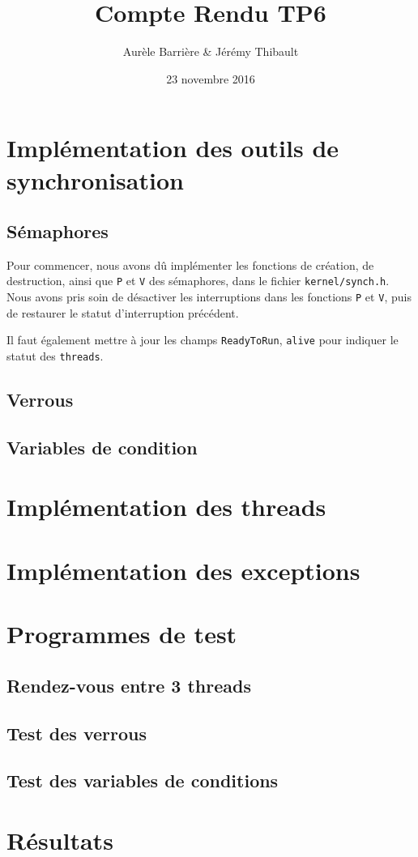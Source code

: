\documentclass{article}
\title{Compte Rendu TP6}
\author{Aurèle Barrière \& Jérémy Thibault}
\date{23 novembre 2016}
\def\file#1{\texttt{#1}}
\def\fun#1{\texttt{#1}}
\def\obj#1{\texttt{#1}}
\begin{document}
\maketitle

\section{Implémentation des outils de synchronisation}
\subsection{Sémaphores}

  Pour commencer, nous avons dû implémenter les fonctions de création, de destruction, ainsi que \fun{P} et \fun{V} des sémaphores, dans le fichier \file{kernel/synch.h}. Nous avons pris soin de désactiver les interruptions dans les fonctions \fun{P} et \fun{V}, puis de restaurer le statut d'interruption précédent.

Il faut également mettre à jour les champs \obj{ReadyToRun}, \obj{alive} pour indiquer le statut des \obj{threads}.

\subsection{Verrous}
\subsection{Variables de condition}

\section{Implémentation des threads}

\section{Implémentation des exceptions}

\section{Programmes de test}
\subsection{Rendez-vous entre 3 threads}
\subsection{Test des verrous}
\subsection{Test des variables de conditions}

\section{Résultats}
\end{document}
